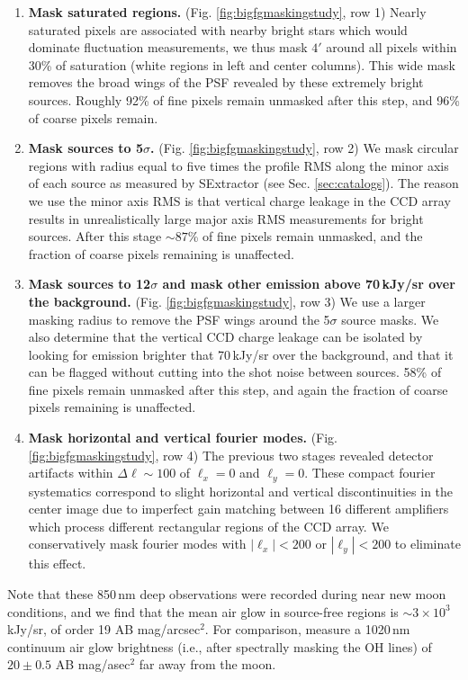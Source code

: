 \documentclass[numberedappendix]{emulateapj}
\begin{document}
\begin{enumerate}
	\item \textbf{Mask saturated regions.} (Fig. \ref{fig:bigfgmaskingstudy}, row 1) Nearly saturated pixels are associated with nearby bright stars which would dominate fluctuation measurements, we thus mask $4'$ around all pixels within 30\% of saturation (white regions in left and center columns). This wide mask removes the broad wings of the PSF revealed by these extremely bright sources. Roughly 92\% of fine pixels remain unmasked after this step, and 96\% of coarse pixels remain.
	\item \textbf{Mask sources to 5$\sigma$.} (Fig. \ref{fig:bigfgmaskingstudy}, row 2) We mask circular regions with radius equal to five times the profile RMS along the minor axis of each source as measured by SExtractor (see Sec. \ref{sec:catalogs}). The reason we use the minor axis RMS is that vertical charge leakage in the CCD array results in unrealistically large major axis RMS measurements for bright sources. After this stage $\sim87$\% of fine pixels remain unmasked, and the fraction of coarse pixels remaining is unaffected.
	\item \textbf{Mask sources to 12$\sigma$ and mask other emission above 70\,kJy/sr over the background.} (Fig. \ref{fig:bigfgmaskingstudy}, row 3) We use a larger masking radius to remove the PSF wings around the 5$\sigma$ source masks. We also determine that the vertical CCD charge leakage can be isolated by looking for emission brighter that 70\,kJy/sr over the background, and that it can be flagged without cutting into the shot noise between sources. 58\% of fine pixels remain unmasked after this step, and again the fraction of coarse pixels remaining is unaffected.
	\item \textbf{Mask horizontal and vertical fourier modes.} (Fig. \ref{fig:bigfgmaskingstudy}, row 4) The previous two stages revealed detector artifacts within $\Delta\ell \sim100$ of $\ell_x=0$ and $\ell_y=0$. These compact fourier systematics correspond to slight horizontal and vertical discontinuities in the center image due to imperfect gain matching between 16 different amplifiers which process different rectangular regions of the CCD array. We conservatively mask fourier modes with $|\ell_x|<200$ or $|\ell_y|<200$ to eliminate this effect.
\end{enumerate}

Note that these 850\,nm deep observations were recorded during near new moon conditions, and we find that the mean air glow in source-free regions is $\sim3\times10^3$ kJy/sr, of order 19 AB mag/arcsec$^2$. For comparison, \citet{sullivan12} measure a 1020\,nm continuum air glow brightness (i.e., after spectrally masking the OH lines) of $20\pm0.5$ AB mag/asec$^2$ far away from the moon. 
\end{document}
